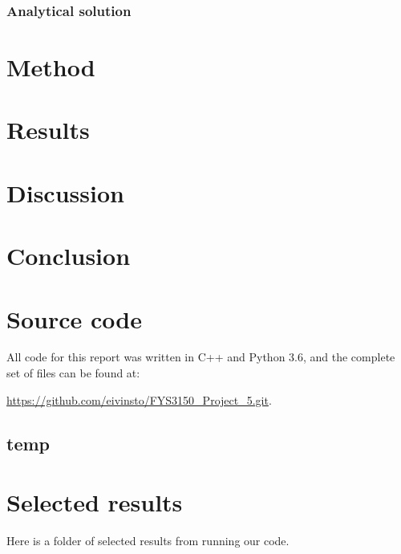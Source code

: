\documentclass[reprint,english,notitlepage]{revtex4-1}  %
\begin{document}
\subsubsection{Analytical solution} \label{sec:formalism_heat_eq_with_source_term_analytical_sol}









\clearpage

\section{Method} \label{sec:method}

\clearpage

\section{Results} \label{sec:results}

\clearpage

\section{Discussion} \label{sec:discussion}

\clearpage



\section{Conclusion} \label{sec:conclusion}

\onecolumngrid
{}
\newpage
\twocolumngrid

\appendix
\section{Source code} \label{A}
All code for this report was written in C++ and Python 3.6, and the complete set of files can be found at:

\url{https://github.com/eivinsto/FYS3150_Project_5.git}.

\cprotect\subsection{temp} \label{A.1}

\clearpage
\section{Selected results} \label{B}
Here is a folder of selected results from running our code.
\end{document}
